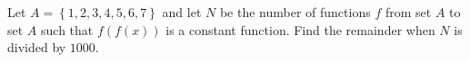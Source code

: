 Let $A = \left\{ 1,2,3,4,5,6,7 \right\}$ and let $N$ be the number of functions $f$ from set $A$ to set $A$ such that $f(f(x))$ is a constant function.  Find the remainder when $N$ is divided by $1000$.